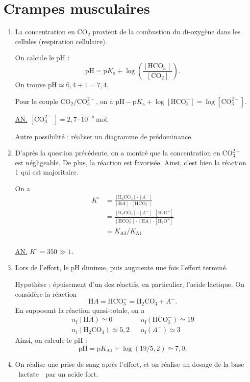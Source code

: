 \section{Crampes musculaires}

\begin{enumerate}
	\item La concentration en $\mathrm{CO_2}$ provient de la combustion du di-oxygène dans les cellules (respiration cellulaire).

		On calcule le $\mathrm{pH}$ : \[
			\mathrm{pH} = \mathrm{p}K_\mathrm{a} + \log\left( \frac{[\mathrm{HCO_3^{-}}]}{[\mathrm{CO_2}]} \right)
		.\] On trouve $\mathrm{pH} \simeq 6{,}4 + 1 = 7{,}4$.

		Pour le couple $\mathrm{CO_2}/\mathrm{CO_3^{2-}}$, on a $\mathrm{pH} - \mathrm{p}K_\mathrm{a} + \log [\mathrm{HCO_3^-}] = \log [\mathrm{CO_3^{2-}}]$.

		\underline{AN.} $[\mathrm{CO_3^{2-}}] = 2{,}7\cdot 10^{-5}\:\mathrm{mol}$.

		Autre possibilité : réaliser un diagramme de prédominance.
	\item D'après la question précédente, on a montré que la concentration en $\mathrm{CO_3^{2-}}$ est négligeable. De plus, la réaction est favorisée. Ainsi, c'est bien la réaction 1 qui est majoritaire.

		On a
		\begin{align*}
			K^\circ &= \frac{[\mathrm{H_2CO_3}] \cdot [A^-]}{[\mathrm{H}A] \cdot [\mathrm{HCO_3^-}]}\\
							&= \frac{[\mathrm{H_2CO_3}] \cdot [A^-] \cdot [\mathrm{H_3O^+}]}{\mathrm{[HCO_3^-]} \cdot [\mathrm{H}A] \cdot \mathrm{[H_3O^+]}} \\
							&= K_\mathrm{A3} / K_\mathrm{A 1}  \\
		\end{align*}

		\underline{AN.} $K^\circ = 350 \gg 1$.
	\item Lors de l'effort, le $\mathrm{pH}$\/ diminue, puis augmente une fois l'effort terminé.
		
		Hypothèse : épuisement d'un des réactifs, en particulier, l'acide lactique.
		On considère la réaction \[
			\mathrm{H}A = \mathrm{HCO_3^-} = \mathrm{H_2CO_3} + A^-
		.\]
		En supposant la réaction quasi-totale, on a
		\begin{align*}
			n_\mathrm{f}(\mathrm{H}A) \simeq 0 && n_\mathrm{f}(\mathrm{HCO_3^-}) \simeq 19\\
			n_\mathrm{f}(\mathrm{H_2CO_3}) \simeq 5{,}2 && n_\mathrm{f}(A^-) \simeq 3
		\end{align*}
		Ainsi, on calcule le $\mathrm{pH}$ : \[
			\mathrm{pH} = \mathrm{p}K_\mathrm{A 1} + \log(19 / 5{,}2) \simeq 7{,}0
		.\]

	\item On réalise une prise de sang après l'effort, et on réalise un dosage de la base \guillemotleft~lactate~\guillemotright\ par un acide fort.
\end{enumerate}
